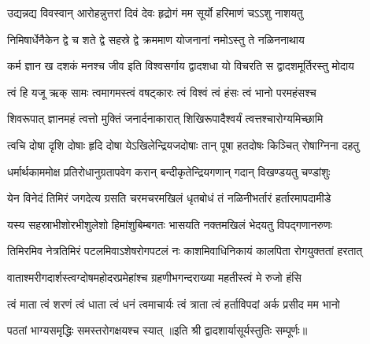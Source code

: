 

\twolineshloka
{उद्यन्नद्य विवस्वान् आरोहन्नुत्तरां दिवं देवः}
{हृद्रोगं मम सूर्यो हरिमाणं चऽऽशु नाशयतु}

\twolineshloka
{निमिषार्धेनैकेन द्वे च शते द्वे सहस्रे द्वे}
{क्रममाण योजनानां नमोऽस्तु ते नळिननाथाय}

\twolineshloka
{कर्म ज्ञान ख दशकं मनश्च जीव इति विश्वसर्गाय}
{द्वादशधा यो विचरति स द्वादशमूर्तिरस्तु मोदाय}

\twolineshloka
{त्वं हि यजू ऋक् सामः त्वमागमस्त्वं वषट्कारः}
{त्वं विश्वं त्वं हंसः त्वं भानो परमहंसश्च}

\twolineshloka
{शिवरूपात् ज्ञानमहं त्वत्तो मुक्तिं जनार्दनाकारात्}
{शिखिरूपादैश्वर्यं त्वत्तश्चारोग्यमिच्छामि}

\twolineshloka
{त्वचि दोषा दृशि दोषाः हृदि दोषा येऽखिलेन्द्रियजदोषाः}
{तान् पूषा हतदोषः किञ्चित् रोषाग्निना दहतु}

\twolineshloka
{धर्मार्थकाममोक्ष प्रतिरोधानुग्रतापवेग करान्}
{बन्दीकृतेन्द्रियगणान् गदान् विखण्डयतु चण्डांशुः}

\twolineshloka
{येन विनेदं तिमिरं जगदेत्य ग्रसति चरमचरमखिलं}
{धृतबोधं तं नळिनीभर्तारं हर्तारमापदामीडे}

\twolineshloka
{यस्य सहस्राभीशोरभीशुलेशो हिमांशुबिम्बगतः}
{भासयति नक्तमखिलं भेदयतु विपद्गणानरुणः}

\twolineshloka
{तिमिरमिव नेत्रतिमिरं पटलमिवाऽशेषरोगपटलं नः}
{काशमिवाधिनिकायं कालपिता रोगयुक्ततां हरतात्}

\twolineshloka
{वाताश्मरीगदार्शस्त्वग्दोषमहोदरप्रमेहांश्च}
{ग्रहणीभगन्दराख्या महतीस्त्वं मे रुजो हंसि}

\twolineshloka
{त्वं माता त्वं शरणं त्वं धाता त्वं धनं त्वमाचार्यः}
{त्वं त्राता त्वं हर्ताविपदां अर्क प्रसीद मम भानो}

{पठतां भाग्यसमृद्धिः समस्तरोगक्षयश्च स्यात्}
॥इति श्री द्वादशार्यासूर्यस्तुतिः सम्पूर्णः॥